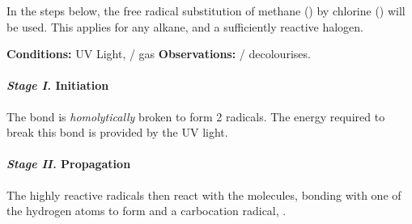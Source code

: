 				In the steps below, the free radical substitution of methane () by chlorine () will be used. This applies
				for any alkane, and a sufficiently reactive halogen.

				\vspace{1.5em}

				\vbox{\textbf{Conditions:}	\tabto{35mm}UV Light,  /  gas}
				\vbox{\textbf{Observations:}\tabto{35mm}  /   decolourises.}

				\paragraph{\textit{Stage I.\protect\hphantom{II}}\hspace{5mm} Initiation}

					The \ch{\Cl-\Cl} bond is \textit{homolytically} broken to form 2 \ch{\Cl} radicals.
					The energy required to break this bond is provided by the UV light.



				\paragraph{\textit{Stage II.\protect\hphantom{I}}\hspace{5mm} Propagation}

					The highly reactive \ch{\Cl} radicals then react with the  molecules, bonding with one of the
					hydrogen atoms to form  and a carbocation radical, .



